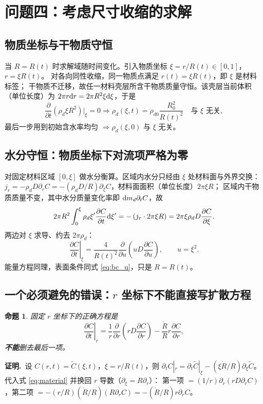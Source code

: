 \documentclass[bwprint]{cumcmthesis}
\newtheorem{proposition}{命题}
\begin{document}
\section{问题四：考虑尺寸收缩的求解}
\label{sec:shrink}

\subsection{物质坐标与干物质守恒}

当 $R=R(t)$ 时求解域随时间变化。引入物质坐标 $\xi=r/R(t)\in[0,1]$，$r=\xi R(t)$。
对各向同性收缩，同一物质点满足 $r(t)=\xi R(t)$，即 $\xi$ 是材料标签；
干物质不迁移，故任一材料壳层所含干物质质量守恒。该壳层当前体积（单位长度）为
$2\pi r{\rm d}r=2\pi R^2\xi{\rm d}\xi$，于是
\[
\frac{\partial}{\partial t}\left(\rho_d\xi R^2\right)\Big|_\xi=0
\Longrightarrow
\rho_d(\xi,t)=\rho_{d0}\frac{R_0^2}{R(t)^2}\quad\text{与 }\xi\text{ 无关},
\]
最后一步用到初始含水率均匀 $\Rightarrow\rho_d(\xi,0)$ 与 $\xi$ 无关。

\subsection{水分守恒：物质坐标下对流项严格为零}

对固定材料区域 $[0,\xi]$ 做水分衡算。区域内水分只经由 $\xi$ 处材料面与外界交换：
$j_r=-\rho_dD\partial_rC=-(\rho_dD/R)\partial_\xi C$，材料面面积（单位长度）$2\pi\xi R$；
区域内干物质质量不变，其中水分质量变化率即 ${\rm d}m_d\partial_tC$，故
\[
2\pi R^2\int_0^\xi\rho_d\xi'\frac{\partial C}{\partial t}{\rm d}\xi'
=-\left(j_r\cdot2\pi\xi R\right)=2\pi\xi\rho_dD\frac{\partial C}{\partial\xi}.
\]
两边对 $\xi$ 求导、约去 $2\pi\rho_d$：
\begin{equation}
\boxed{\;\left.\frac{\partial C}{\partial t}\right|_\xi
=\frac{4}{R(t)^2}\frac{\partial}{\partial u}\left(uD\frac{\partial C}{\partial u}\right),
\qquad u=\xi^2 .\;}
\label{eq:material}
\end{equation}
能量方程同理，表面条件同式 \eqref{eq:bc_u}，只是 $R=R(t)$。

\subsection{一个必须避免的错误：$r$ 坐标下不能直接写扩散方程}

\begin{proposition}
固定 $r$ 坐标下的正确方程是
\begin{equation}
\left.\frac{\partial C}{\partial t}\right|_r
=\frac{1}{r}\frac{\partial}{\partial r}\left(rD\frac{\partial C}{\partial r}\right)
-\frac{\dot R}{R}r\frac{\partial C}{\partial r},
\label{eq:radv}
\end{equation}
\textbf{不能}删去最后一项。
\end{proposition}
\noindent\textbf{证明.}\ 
设 $C(r,t)=\tilde C(\xi,t)$，$\xi=r/R(t)$，则
$\partial_tC|_r=\partial_t\tilde C|_\xi-(\xi\dot R/R)\partial_\xi\tilde C$。
代入式 \eqref{eq:material} 并换回 $r$ 导数（$\partial_\xi=R\partial_r$）：
第一项 $=(1/r)\partial_r(rD\partial_rC)$，第二项
$=-(r/R)(\dot R/R)(R\partial_rC)=-(\dot R/R)r\partial_rC$。
\end{document}
